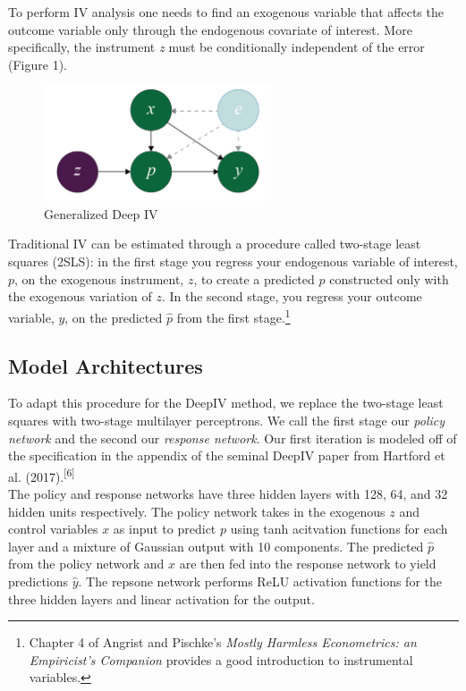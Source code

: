 \documentclass[11pt, oneside]{article}   	%
\begin{document}
To perform IV analysis one needs to find an exogenous variable that affects the outcome variable only through the endogenous covariate of interest. More specifically, the instrument \emph{z} must be conditionally independent of the error (Figure 1).\\

\begin{figure}[h]
	\caption{Generalized Deep IV}
	\centering
	\includegraphics[width=0.6\textwidth]{Figure_1.png}
\end{figure}

Traditional IV can be estimated through a procedure called two-stage least squares (2SLS): in the first stage you regress your endogenous variable of interest, $p$,  on the exogenous instrument, $z$, to create a predicted $\hat{p}$ constructed only with the exogenous variation of $z$. In the second stage, you regress your outcome variable, $y$, on the predicted $\hat{p}$ from the first stage.\footnote{Chapter 4 of Angrist and Pischke's \emph{Mostly Harmless Econometrics: an Empiricist's Companion} provides a good introduction to instrumental variables.}\\

\subsection{Model Architectures}

To adapt this procedure for the DeepIV method, we replace the two-stage least squares with two-stage multilayer perceptrons. We call the first stage our \emph{policy network} and the second our \emph{response network}. Our first iteration is modeled off of the specification in the appendix of the seminal DeepIV paper from Hartford et al. (2017).\textsuperscript{[6]}\\

The policy and response networks have three hidden layers with 128, 64, and 32 hidden units respectively. The policy network takes in the exogenous $z$ and control variables $x$ as input to predict $p$ using tanh acitvation functions for each layer and a mixture of Gaussian output with 10 components. The predicted $\hat{p}$ from the policy network and $x$ are then fed into the response network to yield predictions $\hat{y}$. The repsone network performs ReLU activation functions for the three hidden layers and linear activation for the output. \\
\end{document}
